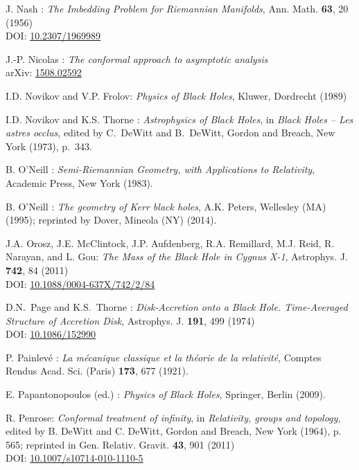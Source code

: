 \begin{thebibliography}{123}
J. Nash  :
{\em The Imbedding Problem for Riemannian Manifolds},
Ann. Math. {\bf 63}, 20 (1956)\\
DOI: \href{https://doi.org/10.2307/1969989}{10.2307/1969989}

J.-P. Nicolas :
{\em The conformal approach to asymptotic analysis} \\
arXiv: \href{https://arxiv.org/abs/1508.02592}{1508.02592}

I.D. Novikov and V.P. Frolov: {\em Physics of Black Holes},
Kluwer, Dordrecht (1989)

I.D. Novikov and K.S. Thorne : {\em Astrophysics of Black Holes},
in {\em Black Holes -- Les astres occlus},  edited by C.~DeWitt and B.~DeWitt,
Gordon and Breach, New York (1973), p.~343.

B. O'Neill : {\em Semi-Riemannian Geometry, with Applications to Relativity},
Academic Press, New York (1983).

B. O'Neill : {\em The geometry of Kerr black holes}, A.K. Peters, Wellesley (MA) (1995);
reprinted by Dover, Mineola (NY) (2014).

J.A. Orosz, J.E. McClintock, J.P. Aufdenberg, R.A. Remillard, M.J. Reid, R. Narayan, and L. Gou:
{\em The Mass of the Black Hole in Cygnus X-1},
Astrophys. J. {\bf 742}, 84 (2011)\\
DOI: \href{https://doi.org/10.1088/0004-637X/742/2/84}{10.1088/0004-637X/742/2/84}

D.N.~Page and K.S.~Thorne : \emph{Disk-Accretion onto a Black Hole. Time-Averaged Structure of Accretion Disk},
Astrophys. J. {\bf 191}, 499 (1974)\\
DOI: \href{https://doi.org/10.1086/152990}{10.1086/152990}

P. Painlevé : \emph{La mécanique classique et la théorie de la relativité},
Comptes Rendus Acad. Sci. (Paris) {\bf 173}, 677 (1921).

E. Papantonopoulos (ed.) : {\em Physics of Black Holes}, Springer, Berlin (2009).

R. Penrose: {\em Conformal treatment of infinity}, in {\em Relativity, groups and topology},
edited by B. DeWitt and C. DeWitt,
Gordon and Breach, New York (1964), p. 565; reprinted in
Gen. Relativ. Gravit. {\bf 43}, 901 (2011)\\
DOI: \href{https://doi.org/10.1007/s10714-010-1110-5}{10.1007/s10714-010-1110-5}


\end{thebibliography}
